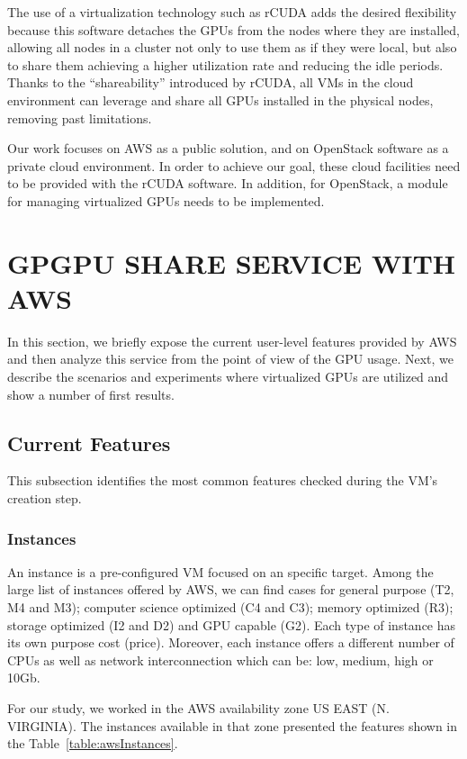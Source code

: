 \documentclass[a4paper,twoside]{article}
\begin{document}
The use of a virtualization technology such as {rCUDA} adds 
the desired flexibility because this software detaches the GPUs 
from the nodes where they are installed, allowing all nodes in a cluster
not only to use them as if they were local, but also to share them 
achieving a higher utilization rate and reducing the idle periods.
Thanks to the ``shareability'' introduced by {rCUDA}, all VMs in the cloud 
environment can leverage and share all GPUs installed in 
the physical nodes, removing past limitations. 

Our work focuses on AWS as a public 
solution, and on OpenStack software as a private cloud environment. 
In order to achieve our goal, these cloud facilities need to be provided with the {rCUDA} software. In addition, for OpenStack, a module for managing virtualized GPUs 
needs to be implemented.  



\section{\uppercase{GPGPU share service with AWS}}
\label{sec:workingaws}
In this section, we briefly expose the current user-level features 
provided by AWS and then analyze this service  
from the point of view of the GPU usage. 
Next, we describe the scenarios and experiments where virtualized GPUs are utilized and show a number of first results.

\subsection{Current Features}
This subsection identifies the most common features checked during 
the VM's creation step.

\subsubsection{Instances}

An instance is a pre-configured VM focused on an 
specific target. Among the large list of instances offered by AWS, 
we can find cases for general purpose (T2, M4 and M3); computer science optimized 
(C4 and C3); memory optimized (R3); storage optimized (I2 and D2) and 
GPU capable (G2). Each type of instance has its own purpose cost (price). 
Moreover, each instance offers a different number of CPUs as well as network 
interconnection which can be: low, medium, high or 10Gb.

For our study, we worked in the AWS availability zone US EAST (N. VIRGINIA). 
The instances available in that zone presented the features shown in the Table~\ref{table:awsInstances}. 
\end{document}

